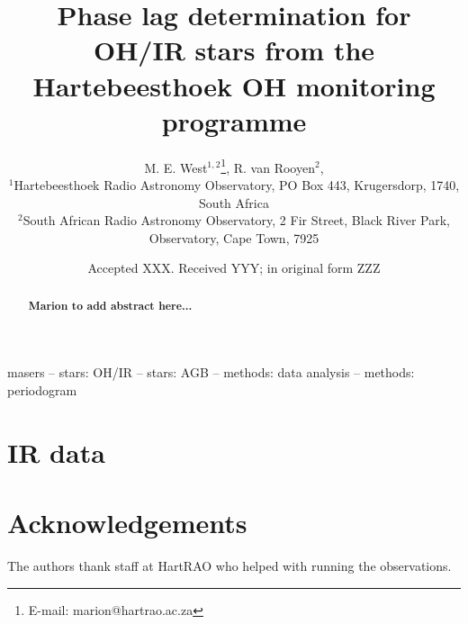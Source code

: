 \documentclass[fleqn,usenatbib]{mnras}
\title[Phase Lags for OH/IR stars]{
Phase lag determination for OH/IR stars from the Hartebeesthoek OH monitoring programme
}
\author[M. E. West et al.]
{M. E. West$^{1,2}$\thanks{E-mail: marion@hartrao.ac.za},
R. van Rooyen$^{2}$,
\\
$^{1}$Hartebeesthoek Radio Astronomy Observatory,
PO Box 443, Krugersdorp, 1740, South Africa \\
$^{2}$South African Radio Astronomy Observatory,
2 Fir Street, Black River Park, Observatory, Cape Town, 7925
}
\date{Accepted XXX. Received YYY; in original form ZZZ}
\begin{document}
\label{firstpage}
\pagerange{\pageref{firstpage}--\pageref{lastpage}}
\maketitle

\begin{abstract}
{\color {red}
\textbf{Marion to add abstract here...}
}
\end{abstract}

\begin{keywords}
masers --
stars: OH/IR --
stars: AGB --
methods: data analysis --
methods: periodogram
\end{keywords}





{\color {red}
\section{IR data}
\label{sec:irdata}
}


\section*{Acknowledgements}

The authors thank staff at HartRAO who
helped with running the observations.







\appendix




\bsp	%
\label{lastpage}
\end{document}
